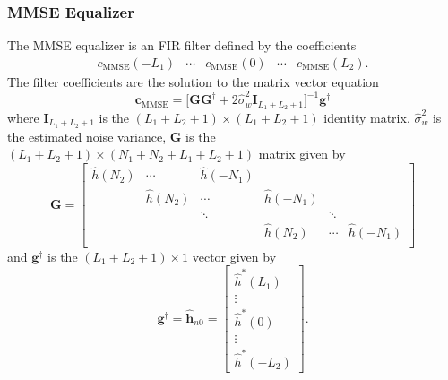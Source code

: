 \subsubsection{MMSE Equalizer}
The MMSE equalizer is an FIR filter defined by the coefficients
\begin{equation}
\begin{matrix}
c_\text{MMSE}(-L_1) & \cdots & c_\text{MMSE}(0) & \cdots & c_\text{MMSE}(L_2).
\end{matrix}
\end{equation}
The filter coefficients are the solution to the matrix vector equation \cite[eq. (330) and (333)]{PAQ-phase1}
\begin{equation}
\mathbf{c}_\text{MMSE} = \big[ \mathbf{G}\mathbf{G}^\dagger + 2\hat{\sigma}^2_w\mathbf{I}_{L_1+L_2+1} \big]^{-1} \mathbf{g}^\dagger
\label{eq:c_MMSE_direct}
\end{equation}
where $\mathbf{I}_{L_1+L_2+1}$ is the $(L_1+L_2+1)\times(L_1+L_2+1)$ identity matrix,
$\hat{\sigma}^2_w$ is the estimated noise variance, $\mathbf{G}$ is the $(L_1+L_2+1)\times(N_1+N_2+L_1+L_2+1)$ matrix given by
\begin{equation}
\mathbf{G} = 
		\begin{bmatrix}
		\hat{h}(N_2)		& \cdots		& \hat{h}(-N_1) 	&  				  \\
							& \hat{h}(N_2)	& \cdots 			& \hat{h}(-N_1)	  \\
				 			& 				& \ddots 			&  				& \ddots	  \\
		 					&  	   			&  					& \hat{h}(N_2)	& \cdots	& \hat{h}(-N_1)	\\
	\end{bmatrix}
\end{equation}
and $\mathbf{g}^\dagger$ is the $(L_1+L_2+1)\times1$ vector given by
\begin{equation}
\mathbf{g}^\dagger = \hat{\mathbf{h}}_{n0} = \begin{bmatrix} \hat{h}^\ast(L_1) \\ \vdots \\ \hat{h}^\ast(0) \\ \vdots \\ \hat{h}^\ast(-L_2)  \end{bmatrix}.
\label{eq:g_dagger_h_n0}
\end{equation}

